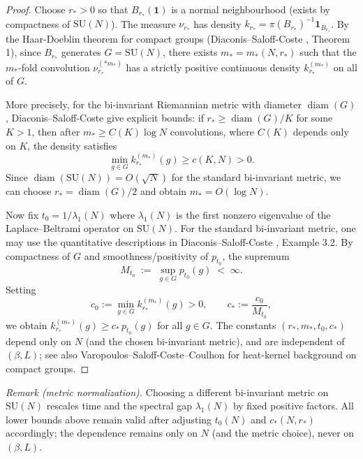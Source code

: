 \documentclass[11pt]{amsart}
\begin{document}
\begin{proof}
Choose $r_*>0$ so that $B_{r_*}(\mathbf 1)$ is a normal neighbourhood (exists by compactness of $\mathrm{SU}(N)$). The measure $\nu_{r_*}$ has density $k_{r_*}=\pi(B_{r_*})^{-1}\mathbf 1_{B_{r_*}}$. By the Haar-Doeblin theorem for compact groups (Diaconis--Saloff-Coste \cite{DiaconisSaloffCoste2004}, Theorem 1), since $B_{r_*}$ generates $G=\mathrm{SU}(N)$, there exists $m_*=m_*(N,r_*)$ such that the $m_*$-fold convolution $\nu_{r_*}^{(*m_*)}$ has a strictly positive continuous density $k_{r_*}^{(m_*)}$ on all of $G$.

More precisely, for the bi-invariant Riemannian metric with diameter $\operatorname{diam}(G)$, Diaconis--Saloff-Coste give explicit bounds: if $r_* \ge \operatorname{diam}(G)/K$ for some $K>1$, then after $m_* \ge C(K)\log N$ convolutions, where $C(K)$ depends only on $K$, the density satisfies
\[
  \min_{g\in G} k_{r_*}^{(m_*)}(g) \ge c(K,N) > 0.
\]
Since $\operatorname{diam}(\mathrm{SU}(N)) = O(\sqrt{N})$ for the standard bi-invariant metric, we can choose $r_* = \operatorname{diam}(G)/2$ and obtain $m_* = O(\log N)$.

Now fix $t_0 = 1/\lambda_1(N)$ where $\lambda_1(N)$ is the first nonzero eigenvalue of the Laplace--Beltrami operator on $\mathrm{SU}(N)$. For the standard bi-invariant metric, one may use the quantitative descriptions in Diaconis--Saloff-Coste \cite{DiaconisSaloffCoste2004}, Example 3.2. By compactness of $G$ and smoothness/positivity of $p_{t_0}$, the supremum
\[
  M_{t_0} \;:=\; \sup_{g\in G} p_{t_0}(g) \;<\; \infty.
\]
Setting
\[
  c_0 := \min_{g\in G} k_{r_*}^{(m_*)}(g) > 0, \qquad c_* := \frac{c_0}{M_{t_0}},
\]
we obtain $k_{r_*}^{(m_*)}(g) \ge c_*\, p_{t_0}(g)$ for all $g \in G$. The constants $(r_*, m_*, t_0, c_*)$ depend only on $N$ (and the chosen bi-invariant metric), and are independent of $(\beta,L)$; see also Varopoulos–Saloff-Coste–Coulhon \cite{VaropoulosSaloffCosteCoulhon1992} for heat-kernel background on compact groups.
\end{proof}

\noindent\emph{Remark (metric normalization).} Choosing a different bi-invariant metric on $\mathrm{SU}(N)$ rescales time and the spectral gap $\lambda_1(N)$ by fixed positive factors. All lower bounds above remain valid after adjusting $t_0(N)$ and $c_*(N,r_*)$ accordingly; the dependence remains only on $N$ (and the metric choice), never on $(\beta,L)$.
\end{document}
